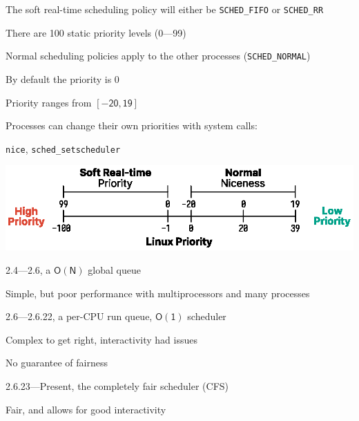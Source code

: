   \begin{slide}


    The soft real-time scheduling policy will either be \texttt{SCHED\_FIFO}
    or \texttt{SCHED\_RR}

    \leftspace{}There are 100 static priority levels (0---99)
    \medskip

    Normal scheduling policies apply to the other processes
    (\texttt{SCHED\_NORMAL})

    \leftspace{}By default the priority is 0

    \leftspace{}Priority ranges from $\mathsf{[-20, 19]}$
    \medskip

    Processes can change their own priorities with system calls:

    \leftspace{}\texttt{nice}, \texttt{sched\_setscheduler}

  \end{slide}

  \begin{slide}
    

    \includegraphics{linux-priority.eps}

  \end{slide}

  \begin{slide}


    2.4---2.6, a $\mathsf{O(N)}$ global queue

    \leftspace{}Simple, but poor performance with multiprocessors and many processes
    \medskip

    2.6---2.6.22, a per-CPU run queue, $\mathsf{O(1)}$ scheduler

    \leftspace{}Complex to get right, interactivity had issues

    \leftspace{}No guarantee of fairness
    \medskip

    2.6.23---Present, the completely fair scheduler (CFS)

    \leftspace{}Fair, and allows for good interactivity

  \end{slide}

